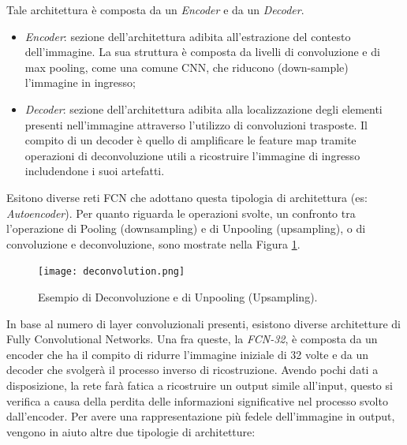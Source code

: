 Tale architettura è composta da un \emph{Encoder} e da un 
\emph{Decoder}.
\begin{itemize}
    \item \emph{Encoder}: sezione dell'architettura adibita all'estrazione del contesto 
    dell'immagine. La sua struttura è composta da livelli di convoluzione 
    e di max pooling, come una comune CNN, che riducono (down-sample) 
    l'immagine in ingresso; 
    \item \emph{Decoder}: sezione dell'architettura adibita alla localizzazione  degli 
    elementi presenti nell'immagine attraverso l'utilizzo di convoluzioni 
    trasposte. Il compito di un decoder è quello di amplificare le feature 
    map tramite operazioni di deconvoluzione utili a ricostruire l'immagine 
    di ingresso includendone i suoi artefatti.
\end{itemize}
Esitono diverse reti FCN che adottano questa tipologia di architettura (es: 
\emph{Autoencoder}). Per quanto riguarda le operazioni svolte, un confronto tra 
l'operazione di Pooling (downsampling) e di Unpooling (upsampling), o di 
convoluzione e deconvoluzione, sono mostrate nella Figura \ref{deconvolution}.
\begin{figure}
    \centering
    \texttt{[image: deconvolution.png]}
    \centering
    \caption{Esempio di Deconvoluzione e di Unpooling (Upsampling).}
    \label{deconvolution}
\end{figure}
In base 
al numero di layer convoluzionali presenti, esistono diverse architetture di 
Fully Convolutional Networks. Una fra queste, la \emph{FCN-32}, è composta da 
un encoder che ha il compito di ridurre l'immagine iniziale di 32 volte e da 
un decoder che svolgerà il processo inverso di ricostruzione. Avendo pochi 
dati a disposizione, la rete farà fatica a ricostruire un output simile all'input, 
questo si verifica a causa della perdita delle informazioni significative nel 
processo svolto dall'encoder. Per avere una rappresentazione più fedele 
dell'immagine in output, vengono in aiuto altre due tipologie di architetture: 
